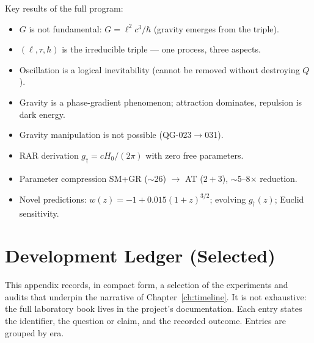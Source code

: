 \documentclass[10pt,twoside,openany]{book}
\begin{document}
Key results of the full program:
\begin{itemize}
\item $G$ is not fundamental: $G=\ell^2c^3/\hbar$ (gravity emerges from the triple).
\item $(\ell,\tau,\hbar)$ is the irreducible triple — one process, three aspects.
\item Oscillation is a logical inevitability (cannot be removed without destroying $Q$).
\item Gravity is a phase-gradient phenomenon; attraction dominates, repulsion is dark
energy.
\item Gravity manipulation is not possible (QG-023$\to$031).
\item RAR derivation $g_\dagger=cH_0/(2\pi)$ with zero free parameters.
\item Parameter compression SM+GR ($\sim$26) $\to$ AT ($2{+}3$), $\sim$5--8$\times$
reduction.
\item Novel predictions: $w(z)=-1+0.015(1+z)^{3/2}$; evolving $g_\dagger(z)$; Euclid
sensitivity.
\end{itemize}

\chapter{Development Ledger (Selected)}
\label{app:ledger}

This appendix records, in compact form, a selection of the experiments and audits that
underpin the narrative of Chapter~\ref{ch:timeline}. It is not exhaustive: the full
laboratory book lives in the project's documentation. Each entry states the identifier,
the question or claim, and the recorded outcome. Entries are grouped by era.
\end{document}
